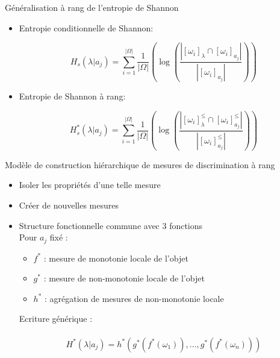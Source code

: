 \documentclass[usenames,dvipsnames]{beamer}
\newcommand{\beamcite}[1]{\hfill {\footnotesize \textcite{#1}}}
\begin{document}
\begin{frame}{Généralisation à rang de l'entropie de Shannon}
\begin{itemize}
\item Entropie conditionnelle de Shannon: 

$$H_s\left(\lambda | a_j\right) = \sum_{i=1}^{|\Omega|} \frac{1}{|\Omega|}\left(\log \left(\frac{|[\omega_i]_{\lambda} \cap [\omega_i]_{a_j}|}{|[\omega_i]_{a_j}|}\right)\right)$$

\item Entropie de Shannon à rang: 

$$H^*_s\left(\lambda | a_j\right) = \sum_{i=1}^{|\Omega|} \frac{1}{|\Omega|}\left(\log \left(\frac{|[\omega_i]^{\leq}_{\lambda} \cap [\omega_i]^{\leq}_{a_j}|}{|[\omega_i]^{\leq}_{a_j}|}\right)\right)$$

\end{itemize}

\end{frame}

\begin{frame}{Modèle de construction hiérarchique de mesures de discrimination à rang \beamcite{marsala-rank}}
\begin{itemize}
\item Isoler les propriétés d'une telle mesure
\item Créer de nouvelles mesures
\item Structure fonctionnelle commune avec 3 fonctions \\
Pour $a_j$ fixé :
\begin{itemize}
\item $f^*$ : mesure de monotonie locale de l'objet
\item $g^*$ : mesure de non-monotonie locale de l'objet
\item $h^*$ : agrégation de mesures de non-monotonie locale
\end{itemize}
Ecriture générique : \\~\
            $$H^*(\lambda | a_j) = h^*(g^*(f^*(\omega_1)),...,g^*(f^*(\omega_n)))$$
\end{itemize}
\end{frame}
\end{document}
